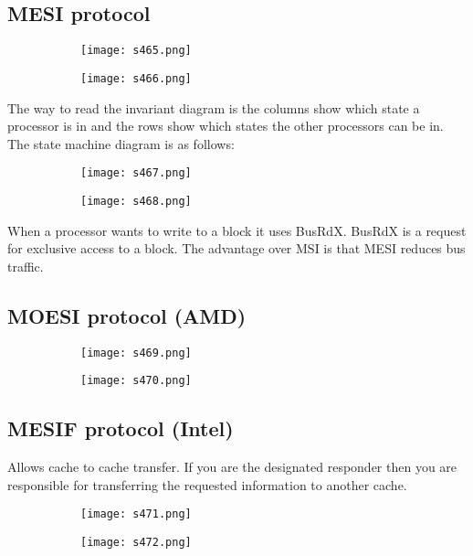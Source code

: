 \documentclass[8pt]{extreport}
\begin{document}
\subsection{MESI protocol}
 \begin{figure}[H]
\begin{subfigure}[b]{0.4\linewidth}
\texttt{[image: s465.png]}
\end{subfigure}
\begin{subfigure}[b]{0.4\linewidth}
\texttt{[image: s466.png]}
\end{subfigure}
\end{figure}
The way to read the invariant diagram is the columns show which state a processor is in and the rows show which states the other processors can be in.\\
The state machine diagram is as follows:
 \begin{figure}[H]
\begin{subfigure}[b]{0.4\linewidth}
\texttt{[image: s467.png]}
\end{subfigure}
\begin{subfigure}[b]{0.4\linewidth}
\texttt{[image: s468.png]}
\end{subfigure}
\end{figure}
When a processor wants to write to a block it uses BusRdX. BusRdX is a request for exclusive access to a block.
The advantage over MSI is that MESI reduces bus traffic.
\subsection{MOESI protocol (AMD)}
 \begin{figure}[H]
\begin{subfigure}[b]{0.4\linewidth}
\texttt{[image: s469.png]}
\end{subfigure}
\begin{subfigure}[b]{0.4\linewidth}
\texttt{[image: s470.png]}
\end{subfigure}
\end{figure}

\subsection{MESIF protocol (Intel)}
Allows cache to cache transfer. If you are the designated responder then you are responsible for transferring the requested information to another cache.
 \begin{figure}[H]
\begin{subfigure}[b]{0.4\linewidth}
\texttt{[image: s471.png]}
\end{subfigure}
\begin{subfigure}[b]{0.4\linewidth}
\texttt{[image: s472.png]}
\end{subfigure}
\end{figure}
\end{document}

